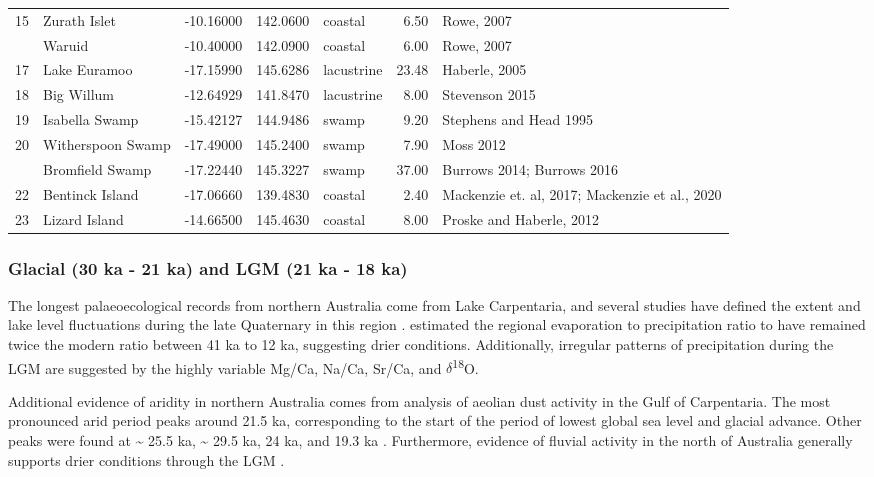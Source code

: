\documentclass[
  12pt,
]{book}
\begin{document}
\begin{landscape}
\begin{longtable}[t]{rlrrlr>{\raggedright\arraybackslash}p{5cm}}
15 & Zurath Islet & -10.16000 & 142.0600 & coastal & 6.50 & Rowe, 2007\\
\addlinespace
16 & Waruid & -10.40000 & 142.0900 & coastal & 6.00 & Rowe, 2007\\
17 & Lake Euramoo & -17.15990 & 145.6286 & lacustrine & 23.48 & Haberle, 2005\\
18 & Big Willum & -12.64929 & 141.8470 & lacustrine & 8.00 & Stevenson 2015\\
19 & Isabella Swamp & -15.42127 & 144.9486 & swamp & 9.20 & Stephens and Head 1995\\
20 & Witherspoon Swamp & -17.49000 & 145.2400 & swamp & 7.90 & Moss 2012\\
\addlinespace
21 & Bromfield Swamp & -17.22440 & 145.3227 & swamp & 37.00 & Burrows 2014; Burrows 2016\\
22 & Bentinck Island & -17.06660 & 139.4830 & coastal & 2.40 & Mackenzie et. al, 2017; Mackenzie et al., 2020\\
23 & Lizard Island & -14.66500 & 145.4630 & coastal & 8.00 & Proske and Haberle, 2012\\*
\end{longtable}
\end{landscape}



\hypertarget{LGM}{%
\subsubsection{Glacial (30 ka - 21 ka) and LGM (21 ka - 18 ka)}\label{LGM}}

The longest palaeoecological records from northern Australia come from Lake Carpentaria, and several studies have defined the extent and lake level fluctuations during the late Quaternary in this region \citep{jonesLateQuaternaryEvolution1988, mccullochStrontiumIsotopeVariations1989a, reevesPalaeoenvironmentalChangeGulf2007, reevesSedimentaryRecordPalaeoenvironments2008, torgersenLateQuaternaryHydrological1985a, devriendtLateQuaternaryEnvironment2011}. \citet{torgersenLateQuaternaryHydrological1985a} estimated the regional evaporation to precipitation ratio to have remained twice the modern ratio between 41 ka to 12 ka, suggesting drier conditions. Additionally, irregular patterns of precipitation during the LGM are suggested by the highly variable Mg/Ca, Na/Ca, Sr/Ca, and \(\delta\)\textsuperscript{18}O.

Additional evidence of aridity in northern Australia comes from analysis of aeolian dust activity \citep{dedeckkerLatePleistoceneRecord1991, dedeckkerLateQuaternaryCyclic2001} in the Gulf of Carpentaria. The most pronounced arid period peaks around 21.5 ka, corresponding to the start of the period of lowest global sea level and glacial advance. Other peaks were found at \textasciitilde{} 25.5 ka, \textasciitilde{} 29.5 ka, 24 ka, and 19.3 ka \citep{dedeckkerLateQuaternaryCyclic2001}. Furthermore, evidence of fluvial activity in the north of Australia generally supports drier conditions through the LGM \citep{nansonComparativeUraniumThoriumThermoluminescence1991, nansonQuaternaryStratigraphyGeochronology1993}.
\end{document}
